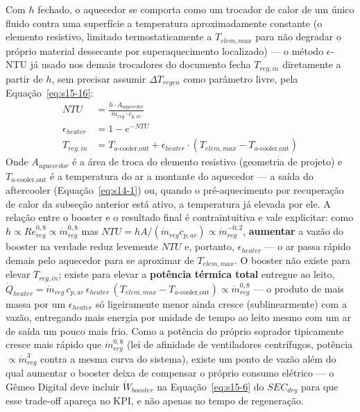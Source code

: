 \documentclass[12pt,a4paper]{article}
\numberwithin{equation}{section}
\numberwithin{table}{section}
\numberwithin{figure}{section}
\begin{document}
		Com $h$ fechado, o aquecedor se comporta como um trocador de calor de um único fluido contra uma superfície a temperatura aproximadamente constante (o elemento resistivo, limitado termostaticamente a $T_{elem,max}$ para não degradar o próprio material dessecante por superaquecimento localizado) — o método $\epsilon$-NTU já usado nos demais trocadores do documento fecha $T_{reg,in}$ diretamente a partir de $h$, sem precisar assumir $\Delta T_{regen}$ como parâmetro livre, pela Equação~\eqref{eq:s15-16}:
		\begin{equation}\label{eq:s15-16}
		\begin{aligned}
			NTU &= \frac{h \cdot A_{aquecedor}}{\dot{m}_{reg} \cdot c_{p,ar}} \\[4pt]
			\epsilon_{heater} &= 1 - e^{-NTU} \\[4pt]
			T_{reg,in} &= T_{a\text{-cooler,out}} + \epsilon_{heater} \cdot \left( T_{elem,max} - T_{a\text{-cooler,out}} \right)
		\end{aligned}
	\end{equation}
		Onde $A_{aquecedor}$ é a área de troca do elemento resistivo (geometria de projeto) e $T_{a\text{-cooler,out}}$ é a temperatura do ar a montante do aquecedor — a saída do aftercooler (Equação~\eqref{eq:s14-1}) ou, quando o pré-aquecimento por recuperação de calor da subseção anterior está ativo, a temperatura já elevada por ele. A relação entre o booster e o resultado final é contraintuitiva e vale explicitar: como $h \propto Re_{reg}^{0{,}8} \propto \dot{m}_{reg}^{0{,}8}$ mas $NTU = hA/(\dot{m}_{reg}c_{p,ar}) \propto \dot{m}_{reg}^{-0{,}2}$, \textbf{aumentar} a vazão do booster na verdade reduz levemente $NTU$ e, portanto, $\epsilon_{heater}$ — o ar passa rápido demais pelo aquecedor para se aproximar de $T_{elem,max}$. O booster não existe para elevar $T_{reg,in}$; existe para elevar a \textbf{potência térmica total} entregue ao leito, $\dot{Q}_{heater} = \dot{m}_{reg} \, c_{p,ar} \, \epsilon_{heater} \, (T_{elem,max} - T_{a\text{-cooler,out}}) \propto \dot{m}_{reg}^{0{,}8}$ — o produto de mais massa por um $\epsilon_{heater}$ só ligeiramente menor ainda cresce (sublinearmente) com a vazão, entregando mais energia por unidade de tempo ao leito mesmo com um ar de saída um pouco mais frio. Como a potência do próprio soprador tipicamente cresce mais rápido que $\dot{m}_{reg}^{0{,}8}$ (lei de afinidade de ventiladores centrífugos, potência $\propto \dot{m}_{reg}^{3}$ contra a mesma curva do sistema), existe um ponto de vazão além do qual aumentar o booster deixa de compensar o próprio consumo elétrico — o Gêmeo Digital deve incluir $\dot{W}_{booster}$ na Equação~\eqref{eq:s15-6} do $SEC_{dry}$ para que esse trade-off apareça no KPI, e não apenas no tempo de regeneração.
\end{document}
